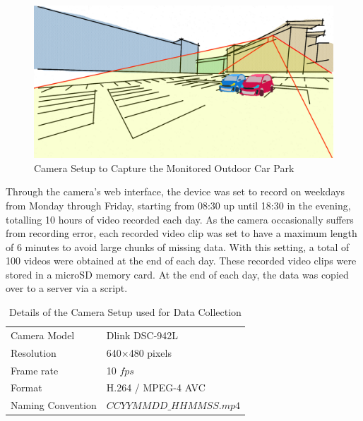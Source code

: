 \begin{figure}[hbt!]\centering
\includegraphics[width=.8\textwidth]{image/new/fcicarpark2.png}
\caption{Camera Setup to Capture the Monitored Outdoor Car Park}
\label{fig:camerasetup}
\end{figure}



Through the camera's web interface, the device was set to record on weekdays from Monday through Friday, starting from 08:30 up until 18:30 in the evening, totalling 10 hours of video recorded each day. As the camera occasionally suffers from recording error, each recorded video clip was set to have a maximum length of 6 minutes to avoid large chunks of missing data. With this setting, a total of 100 videos were obtained at the end of each day. These recorded video clips were stored in a microSD memory card.
At the end of each day, the data was copied over to a server via a script. 

\begin{table}[!bt]\centering
\caption{Details of the Camera Setup used for Data Collection}
\begin{tabular}{|l|l|}
\hline
Camera Model & Dlink DSC-942L        \\
Resolution   & 640$\times$480 pixels \\
Frame rate   & 10 $fps$             \\
Format       & H.264 / MPEG-4 AVC    \\
Naming Convention & $CCYYMMDD\_HHMMSS.mp4$ \\
\hline
\end{tabular}
\end{table}

